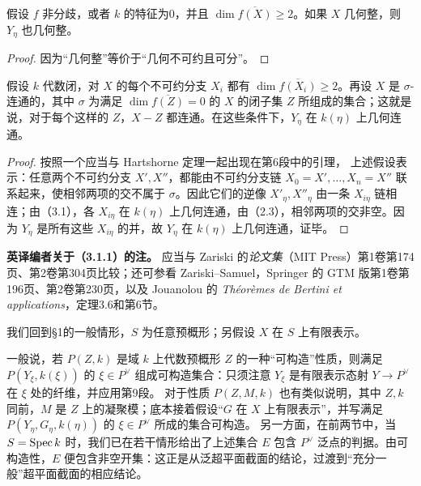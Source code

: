 假设 $f$ 非分歧，或者 $k$ 的特征为0，并且 $\dim\overline{f(X)}\geq2$。如果 $X$ 几何整，则 $Y_\eta$ 也几何整。
\begin{proof}
因为“几何整”等价于“几何不可约且可分”。
\end{proof}

假设 $k$ 代数闭，对 $X$ 的每个不可约分支 $X_i$ 都有 $\dim\overline{f(X_i)}\geq2$。再设 $X$ 是 $\sigma$-连通的，其中 $\sigma$ 为满足 $\dim\overline{f(Z)}=0$ 的 $X$ 的闭子集 $Z$ 所组成的集合；这就是说，对于每个这样的 $Z$，$X-Z$ 都连通。在这些条件下，$Y_\eta$ 在 $k(\eta)$ 上几何连通。
\begin{proof}
按照一个应当与 Hartshorne 定理一起出现在第6段中的引理，
上述假设表示：任意两个不可约分支 $X',X''$，都能由不可约分支链
$X_0=X',\ldots,X_n=X''$ 联系起来，使相邻两项的交不属于 $\sigma$。因此它们的逆像 $X'_\eta,X''_\eta$ 由一条 $X_{i\eta}$ 链相连；由（3.1），各 $X_{i\eta}$ 在 $k(\eta)$ 上几何连通，由（2.3），相邻两项的交非空。因为 $Y_\eta$ 是所有这些 $X_{i\eta}$ 的并，故 $Y_\eta$ 在 $k(\eta)$ 上几何连通，证毕。
\end{proof}
\noindent\textbf{英译编者关于（3.1.1）的注。}
应当与 Zariski 的\textit{论文集}（MIT Press）第1卷第174页、第2卷第304页比较；还可参看 Zariski--Samuel，Springer 的 GTM 版第1卷第196页、第2卷第230页，以及 Jouanolou 的 \textit{Théorèmes de Bertini et applications}，定理3.6和第6节。

我们回到§1的一般情形，$S$ 为任意预概形；另假设 $X$ 在 $S$ 上有限表示。

一般说，若 $P(Z,k)$ 是域 $k$ 上代数预概形 $Z$ 的一种“可构造”性质，则满足 $P(Y_\xi,k(\xi))$ 的 $\xi\in P^\vee$ 组成可构造集合：只须注意 $Y_\xi$ 是有限表示态射 $Y\to P^\vee$ 在 $\xi$ 处的纤维，并应用第9段。
对于性质 $P(Z,M,k)$ 也有类似说明，其中 $Z,k$ 同前，$M$ 是 $Z$ 上的凝聚模；底本接着假设“$G$ 在 $X$ 上有限表示”，并写满足 $P(Y_\eta,G_\eta,k(\eta))$ 的 $\xi\in P^\vee$ 所成的集合可构造。
另一方面，在前两节中，当 $S=\operatorname{Spec} k$ 时，我们已在若干情形给出了上述集合 $E$ 包含 $P^\vee$ 泛点的判据。由可构造性，$E$ 便包含非空开集：这正是从泛超平面截面的结论，过渡到“充分一般”超平面截面的相应结论。


